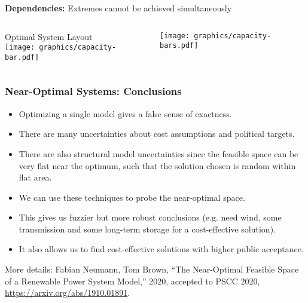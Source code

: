 \documentclass[10pt,aspectratio=169,dvipsnames]{beamer}
\let\olditem\item
\renewcommand{\item}{%
\olditem\vspace{5pt}}
\begin{document}
\begin{frame}{\textbf{Dependencies:} Extremes cannot be achieved simultaneously}

  \begin{columns}

    \begin{column}{0.4\textwidth}
      \begin{center}
        \vspace{-0.5cm}
        \footnotesize Optimal System Layout\\
        \texttt{[image: graphics/capacity-bar.pdf]}
      \end{center}
    \end{column}
    \begin{column}{0.6\textwidth}
      \begin{center}
        \vspace{.3cm}
        \texttt{[image: graphics/capacity-bars.pdf]}
      \end{center}
    \end{column}

  \end{columns}

\end{frame}

\begin{frame}
  \frametitle{Near-Optimal Systems: Conclusions}

  \begin{itemize}
  \item Optimizing a single model gives a \alert{false sense of exactness}.
  \item There are many uncertainties about cost assumptions and political targets.
  \item There are also \alert{structural model uncertainties} since the feasible space can be very \alert{flat} near the optimum, such that the solution chosen is random within flat area.
  \item We can use these techniques to probe the \alert{near-optimal space}.
  \item This gives us fuzzier but \alert{more robust} conclusions (e.g. need wind, some transmission and some long-term storage for a cost-effective solution).
    \item It also allows us to find cost-effective solutions with \alert{higher public acceptance}.

  \end{itemize}

  More details: Fabian Neumann, Tom Brown, ``The Near-Optimal Feasible Space of a Renewable Power System Model,'' 2020, accepted to PSCC 2020, \url{https://arxiv.org/abs/1910.01891}.

\end{frame}
\end{document}
